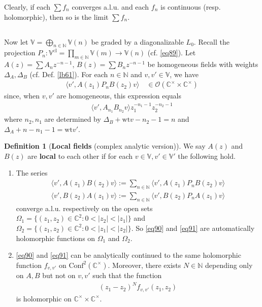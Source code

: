 \documentclass[11pt,b5paper,notitlepage]{article}
\theoremstyle{definition}
\newtheorem{df}{Definition}[section]
\theoremstyle{plain}
\newcommand{\Conf}{\mathrm{Conf}}
\newcommand{\bk}[1]{\langle {#1}\rangle}
\newcommand{\scr}{\mathscr}
\newcommand{\Vbb}{\mathbb V}
\newcommand{\Cbb}{\mathbb C}
\newcommand{\Nbb}{\mathbb N}
\newcommand{\wt}{\mathrm{wt}}
\newcommand{\cl}{\mathrm{cl}}
\numberwithin{equation}{section}
\begin{document}
Clearly, if each $\sum f_n$ converges a.l.u. and each $f_n$ is continuous (resp. holomorphic), then so is the limit $\sum f_n$.



\subsection{}


Now let $\Vbb=\bigoplus_{n\in\Nbb}\Vbb(n)$ be graded by a diagonalizable $L_0$. Recall the projection $P_n:\Vbb^\cl=\prod_{m\in\Nbb}\Vbb(m)\rightarrow \Vbb(n)$ (cf. \eqref{eq89}). Let $A(z)=\sum A_nz^{-n-1}$, $B(z)=\sum B_nz^{-n-1}$ be homogeneous fields with weights $\Delta_A,\Delta_B$ (cf. Def. \ref{lb61}). For each $n\in\Nbb$ and $v,v'\in\Vbb$, we have
\begin{align}
\bk{v',A(z_1)P_nB(z_2)v} \quad \in \scr O(\Cbb^\times\times\Cbb^\times)
\end{align}
since, when $v,v'$ are homogeneous, this expression equals
\begin{align*}
\bk{v',A_{n_1}B_{n_2}v}z_1^{-n_1-1}z_2^{-n_2-1}	
\end{align*}
where $n_2,n_1$ are determined by $\Delta_B+\wt v-n_2-1=n$ and $\Delta_A+n-n_1-1=\wt v'$.
 

\begin{df}[\textbf{Local fields} (complex analytic version)]\label{lb62}
We say $A(z)$ and $B(z)$ are \textbf{local} to each other if for each $v\in\Vbb,v'\in\Vbb'$ the following hold.
\begin{enumerate}
\item The series
\begin{subequations}
\begin{gather}
\bk{v',A(z_1)B(z_2)v}:=\sum_{n\in\Nbb}\bk{v',A(z_1)P_nB(z_2)v}\label{eq90}\\
\bk{v',B(z_2)A(z_1)v}:=\sum_{n\in\Nbb}\bk{v',B(z_2)P_nA(z_1)v}\label{eq91}
\end{gather}
\end{subequations}
converge a.l.u. respectively on the open sets $\Omega_1=\{(z_1,z_2)\in\Cbb^2:0<|z_2|<|z_1|\}$ and $\Omega_2=\{(z_1,z_2)\in\Cbb^2:0<|z_1|<|z_2|\}$. So \eqref{eq90} and \eqref{eq91} are automatically holomorphic functions on $\Omega_1$ and $\Omega_2$.
\item \eqref{eq90} and \eqref{eq91} can be analytically continued to the same holomorphic function $f_{v,v'}$ on $\Conf^2(\Cbb^\times)$. Moreover, there exists $N\in\Nbb$ depending only on $A,B$ but not on $v,v'$ such that the function
\begin{align}
(z_1-z_2)^Nf_{v,v'}(z_1,z_2)	
\end{align}
is holomorphic on $\Cbb^\times\times\Cbb^\times$.
\end{enumerate}
\end{df}
\end{document}
